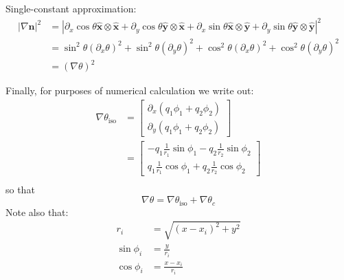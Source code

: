 \documentclass[reqno]{article}
\begin{document}
\noindent
Single-constant approximation:
\begin{equation}
\begin{split}
    \left|\nabla \mathbf{n} \right|^2
    &=
    \left|
    \partial_x \cos\theta \hat{\mathbf{x}} \otimes \hat{\mathbf{x}}
    + \partial_y \cos\theta \hat{\mathbf{y}} \otimes \hat{\mathbf{x}}
    + \partial_x \sin\theta \hat{\mathbf{x}} \otimes \hat{\mathbf{y}}
    + \partial_y \sin\theta \hat{\mathbf{y}} \otimes \hat{\mathbf{y}}
    \right|^2 \\
    &=
    \sin^2\theta (\partial_x \theta)^2
    + \sin^2\theta (\partial_y \theta)^2
    + \cos^2\theta (\partial_x \theta)^2
    + \cos^2 \theta (\partial_y \theta)^2 \\
    &=
    (\nabla \theta)^2
\end{split}
\end{equation}

Finally, for purposes of numerical calculation we write out:
\begin{equation}
\begin{split}
    \nabla \theta_\text{iso}
    &=
    \begin{bmatrix}
        \partial_x \left(q_1 \phi_1 + q_2 \phi_2\right)\\
        \partial_y \left(q_1 \phi_1 + q_2 \phi_2\right)
    \end{bmatrix} \\
    &=
    \begin{bmatrix}
        -q_1 \frac{1}{r_1} \sin\phi_1 - q_2 \frac{1}{r_2} \sin\phi_2 \\
        q_1 \frac{1}{r_1} \cos\phi_1 + q_2 \frac{1}{r_2} \cos\phi_2
    \end{bmatrix} \\
\end{split}
\end{equation}
so that
\begin{equation}
    \nabla \theta
    =
    \nabla \theta_\text{iso}
    + \nabla \theta_c
\end{equation}
Note also that:
\begin{equation}
\begin{split}
    r_i &= \sqrt{(x - x_i)^2 + y^2} \\
    \sin\phi_i &= \frac{y}{r_i} \\
    \cos\phi_i &= \frac{x - x_i}{r_i}
\end{split} 
\end{equation}
\end{document}
